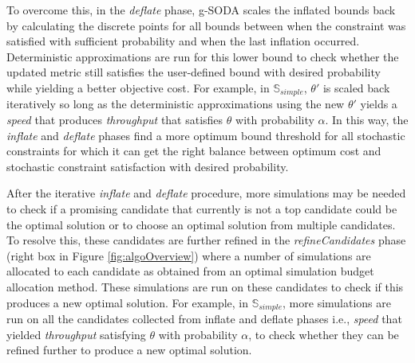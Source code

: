 \documentclass[a4paper, 12pt]{article} %
\begin{document}
To overcome this, in the \textit{deflate} phase, g-SODA scales the inflated bounds back by calculating the discrete points for all bounds between when the constraint was satisfied with sufficient probability and when the last inflation occurred.
 Deterministic approximations are run for this lower bound to check whether the updated metric still satisfies the user-defined bound with desired probability while yielding a better objective cost. 
 For example, in $\mathbb{S}_{simple}$, $\theta'$ is scaled back iteratively so long as the deterministic approximations using the new $\theta'$ yields a \textit{speed} that produces \textit{throughput} that satisfies $\theta$ with probability $\alpha$.
 In this way, the \textit{inflate} and \textit{deflate} phases find a more optimum bound threshold for all stochastic constraints for which it can get the right balance between optimum cost and stochastic constraint satisfaction with desired probability.

After the iterative \textit{inflate} and \textit{deflate} procedure, more simulations may be needed to check if a promising candidate that currently is not a top candidate could be the optimal solution or to choose an optimal solution from multiple candidates. 
To resolve this, these candidates are further refined in the \textit{refineCandidates} phase (right box in Figure \ref{fig:algoOverview}) where a number of simulations are allocated to each candidate as obtained from an optimal simulation budget allocation method. These simulations are run on these candidates to check if this produces a new optimal solution.
 For example, in $\mathbb{S}_{simple}$, more simulations are run on all the candidates collected from inflate and deflate phases i.e., \textit{speed} that yielded \textit{throughput} satisfying $\theta$ with probability $\alpha$, to check whether they can be refined further to produce a new optimal solution.

\end{document}
